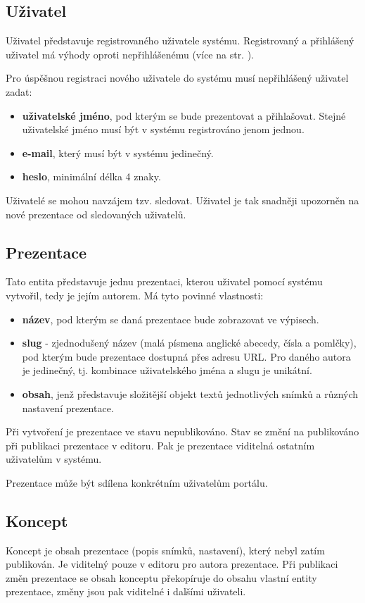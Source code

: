 \documentclass[11pt,twoside,a4paper]{book}
\begin{document}
\subsection{Uživatel}
Uživatel představuje registrovaného uživatele systému. Registrovaný a přihlášený uživatel má výhody oproti nepřihlášenému (více na str. \pageref{chap:userstory}).

Pro úspěšnou registraci nového uživatele do systému musí nepřihlášený uživatel zadat:

\begin{itemize}
	\item \textbf{uživatelské jméno}, pod kterým se bude prezentovat a přihlašovat. Stejné uživatelské jméno musí být v systému registrováno jenom jednou.
	\item \textbf{e-mail}, který musí být v systému jedinečný.
	\item \textbf{heslo}, minimální délka 4 znaky.
\end{itemize}

Uživatelé se mohou navzájem tzv. sledovat. Uživatel je tak snadněji upozorněn na nové prezentace od sledovaných uživatelů.

\subsection{Prezentace}
Tato entita představuje jednu prezentaci, kterou uživatel pomocí systému vytvořil, tedy je jejím autorem. Má tyto povinné
vlastnosti:

\begin{itemize}
	\item \textbf{název}, pod kterým se daná prezentace bude zobrazovat ve výpisech.
	\item \textbf{slug} - zjednodušený název (malá písmena anglické abecedy, čísla a pomlčky), pod kterým bude prezentace dostupná přes adresu URL. Pro daného autora je jedinečný, tj. kombinace uživatelského jména a slugu je unikátní.
	\item \textbf{obsah}, jenž představuje složitější objekt textů jednotlivých snímků a různých nastavení prezentace.
\end{itemize}

Při vytvoření je prezentace ve stavu nepublikováno. Stav se změní na publikováno při publikaci prezentace v editoru. Pak je prezentace viditelná ostatním uživatelům v systému.

Prezentace může být sdílena konkrétním uživatelům portálu.


\subsection{Koncept}
Koncept je obsah prezentace (popis snímků, nastavení), který nebyl zatím publikován. Je viditelný pouze v editoru pro autora prezentace. Při publikaci změn prezentace se obsah konceptu překopíruje do obsahu vlastní entity prezentace, změny jsou pak viditelné i dalšími uživateli.
\end{document}
